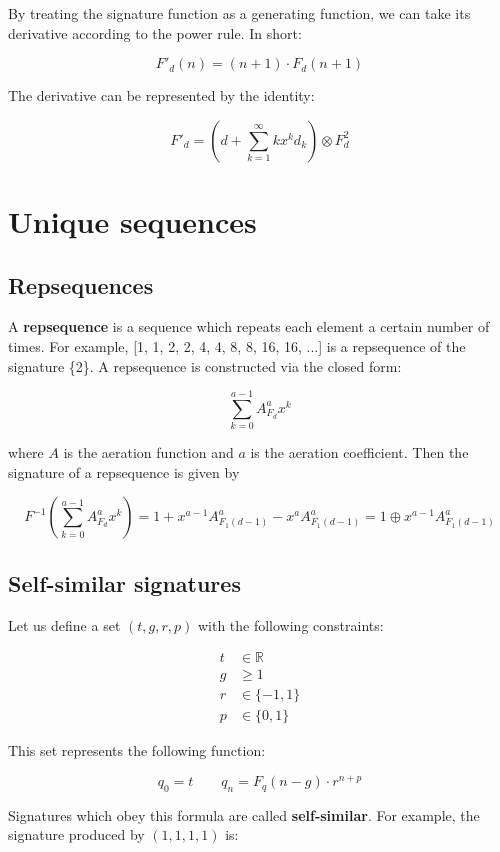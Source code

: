 \documentclass{article}
\begin{document}
By treating the signature function as a generating function, we can take its derivative according to the power rule. In short:

$$F'_d(n) = (n+1) \cdot F_d(n+1)$$

\noindent The derivative can be represented by the identity:

$$F'_d = \left(d + \sum_{k=1}^{\infty} k x^k d_k \right) \otimes F_d^2$$

\section{Unique sequences}

\subsection{Repsequences}

A \textbf{repsequence} is a sequence which repeats each element a certain number of times. For example, [1, 1, 2, 2, 4, 4, 8, 8, 16, 16, ...] is a repsequence of the signature \{2\}. A repsequence is constructed via the closed form:

$$\sum_{k=0}^{a-1} A_{F_d}^a x^k$$

\noindent where $A$ is the aeration function and $a$ is the aeration coefficient. Then the signature of a repsequence is given by

$$F^{-1} \left( \sum_{k=0}^{a-1} A_{F_d}^a x^k \right) = 1 + x^{a-1} A_{F_1 (d-1)}^a - x^a A_{F_1 (d-1)}^a = 1 \oplus x^{a-1} A_{F_1 (d-1)}^a$$

\subsection{Self-similar signatures}

Let us define a set $(t, g, r, p)$ with the following constraints:

\begin{align*}
t &\in \mathbb{R}\\
g &\geq 1\\
r &\in \{-1, 1\}\\
p &\in \{0, 1\}
\end{align*}

\noindent This set represents the following function:

$$q_0 = t \qquad q_n = F_q (n - g) \cdot r^{n+p}$$

\noindent Signatures which obey this formula are called \textbf{self-similar}. For example, the signature produced by $(1, 1, 1, 1)$ is:
\end{document}
